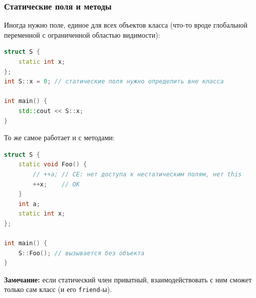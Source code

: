 \subsubsection{Статические поля и методы}
Иногда нужно поле, единое для всех объектов класса (что-то вроде глобальной переменной с ограниченной областью видимости):
\begin{lstlisting}[language=C++]
struct S {
    static int x;
};
int S::x = 0; // статические поля нужно определить вне класса

int main() {
    std::cout << S::x;
}
\end{lstlisting}
То же самое работает и с методами:
\begin{lstlisting}[language=C++]
struct S {
    static void Foo() {
        // ++a; // CE: нет доступа к нестатическим полям, нет this
        ++x;    // OK
    }
    int a;
    static int x;
};

int main() {
    S::Foo(); // вызывается без объекта
}
\end{lstlisting}
\textbf{Замечание:} если статический член приватный, взаимодействовать с ним сможет только сам класс (и его \texttt{friend}-ы).
